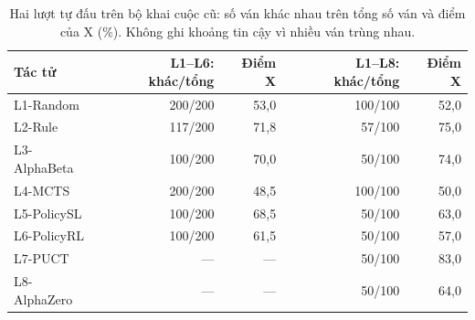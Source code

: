 \begin{table}[H]
  \centering\small
  \caption{Hai lượt tự đấu trên bộ khai cuộc cũ: số ván khác nhau trên tổng số ván và điểm của X (\%). Không ghi khoảng tin cậy vì nhiều ván trùng nhau.}
  \label{tab:e3-cu}
  \setlength{\tabcolsep}{4pt}
  \begin{tabular}{@{}lrrrr@{}}
    \toprule
    Tác tử & L1--L6: khác/tổng & Điểm X & L1--L8: khác/tổng & Điểm X \\
    \midrule
    L1-Random & 200/200 & 53{,}0 & 100/100 & 52{,}0 \\
    L2-Rule & 117/200 & 71{,}8 & 57/100 & 75{,}0 \\
    L3-AlphaBeta & 100/200 & 70{,}0 & 50/100 & 74{,}0 \\
    L4-MCTS & 200/200 & 48{,}5 & 100/100 & 50{,}0 \\
    L5-PolicySL & 100/200 & 68{,}5 & 50/100 & 63{,}0 \\
    L6-PolicyRL & 100/200 & 61{,}5 & 50/100 & 57{,}0 \\
    L7-PUCT & --- & --- & 50/100 & 83{,}0 \\
    L8-AlphaZero & --- & --- & 50/100 & 64{,}0 \\
    \bottomrule
  \end{tabular}
\end{table}
